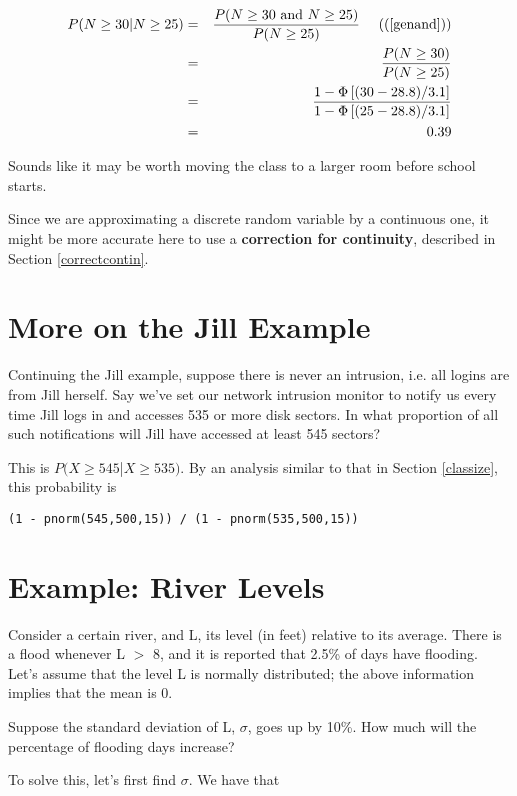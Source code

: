 \begin{eqnarray}
P(N \geq 30 | N \geq 25) 
&=&  
\frac
{P(N \geq 30 \textrm{ and } N \geq 25)}
{P(N \geq 25)} ~~~~ ((\ref{genand})) \\
&=&  
\frac
{P(N \geq 30)}
{P(N \geq 25)} \\
&=& 
\frac
{1 -\Phi \left [ (30-28.8)/3.1 \right ] }
{1 -\Phi \left [ (25-28.8)/3.1 \right ] } \\
&=& 0.39
\end{eqnarray}

Sounds like it may be worth moving the class to a larger room before
school starts.

Since we are approximating a discrete random variable by a continuous
one, it might be more accurate here to use a {\bf correction for
continuity}, described in Section \ref{correctcontin}.

\section{More on the Jill Example}

Continuing the Jill example, suppose there is never an intrusion, i.e.
all logins are from Jill herself.  Say we've set our network intrusion
monitor to notify us every time Jill logs in and accesses 535 or more
disk sectors.  In what proportion of all such notifications will Jill
have accessed at least 545 sectors?  

This is $P(X \geq 545 $|$ X \geq 535)$.  By an analysis similar
to that in Section \ref{classize}, this probability is

\begin{lstlisting}
(1 - pnorm(545,500,15)) / (1 - pnorm(535,500,15))
\end{lstlisting}

\section{Example:  River Levels}

Consider a certain river, and L, its level (in feet) relative to its
average. There is a flood whenever L $>$ 8, and it is reported that 
2.5\% of days have flooding.  Let's assume that the level 
L is normally distributed; the above information implies that the mean
is 0. 

Suppose the standard deviation of L, $\sigma$, goes up by 10\%. How much
will the percentage of flooding days increase?

To solve this, let's first find $\sigma$.  We have that

